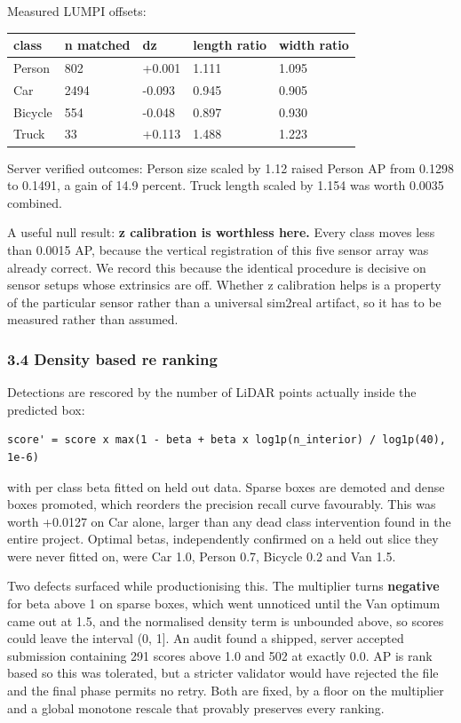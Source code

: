\documentclass[
  10pt,
]{article}
\newcounter{none} %
\begin{document}
Measured LUMPI offsets:

{\def\LTcaptype{none} %
\begin{longtable}[]{@{}lllll@{}}
\toprule\noalign{}
class & n matched & dz & length ratio & width ratio \\
\midrule\noalign{}
\endhead
\bottomrule\noalign{}
\endlastfoot
Person & 802 & +0.001 & 1.111 & 1.095 \\
Car & 2494 & -0.093 & 0.945 & 0.905 \\
Bicycle & 554 & -0.048 & 0.897 & 0.930 \\
Truck & 33 & +0.113 & 1.488 & 1.223 \\
\end{longtable}
}

Server verified outcomes: Person size scaled by 1.12 raised Person AP
from 0.1298 to 0.1491, a gain of 14.9 percent. Truck length scaled by
1.154 was worth 0.0035 combined.

A useful null result: \textbf{z calibration is worthless here.} Every
class moves less than 0.0015 AP, because the vertical registration of
this five sensor array was already correct. We record this because the
identical procedure is decisive on sensor setups whose extrinsics are
off. Whether z calibration helps is a property of the particular sensor
rather than a universal sim2real artifact, so it has to be measured
rather than assumed.

\subsubsection{3.4 Density based re
ranking}\label{density-based-re-ranking}

Detections are rescored by the number of LiDAR points actually inside
the predicted box:

\begin{verbatim}
score' = score x max(1 - beta + beta x log1p(n_interior) / log1p(40), 1e-6)
\end{verbatim}

with per class beta fitted on held out data. Sparse boxes are demoted
and dense boxes promoted, which reorders the precision recall curve
favourably. This was worth +0.0127 on Car alone, larger than any dead
class intervention found in the entire project. Optimal betas,
independently confirmed on a held out slice they were never fitted on,
were Car 1.0, Person 0.7, Bicycle 0.2 and Van 1.5.

Two defects surfaced while productionising this. The multiplier turns
\textbf{negative} for beta above 1 on sparse boxes, which went unnoticed
until the Van optimum came out at 1.5, and the normalised density term
is unbounded above, so scores could leave the interval (0, 1{]}. An
audit found a shipped, server accepted submission containing 291 scores
above 1.0 and 502 at exactly 0.0. AP is rank based so this was
tolerated, but a stricter validator would have rejected the file and the
final phase permits no retry. Both are fixed, by a floor on the
multiplier and a global monotone rescale that provably preserves every
ranking.
\end{document}

